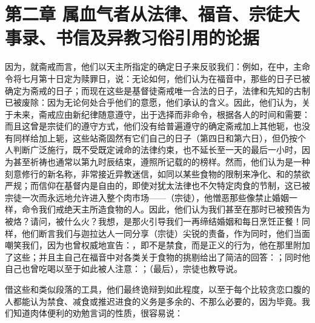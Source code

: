 
\section{第二章 属血气者从法律、福音、宗徒大事录、书信及异教习俗引用的论据}

因为，就斋戒而言，他们以天主所指定的确定日子来反驳我们：例如，在中，主命令将七月第十日定为赎罪日，说：无论如何，他们认为在福音中，那些的日子已被确定为斋戒的日子；而现在这些是基督徒斋戒唯一合法的日子，法律和先知的古制已被废除：因为无论何处合乎他们的意愿，他们承认的含义。因此，他们认为，关于未来，斋戒应由新纪律随意遵守，出于选择而非命令，根据各人的时间和需要：而且这曾是宗徒们的遵守方式，他们没有给普遍遵守的确定斋戒加上其他轭，也没有同样给加上轭，这些站斋固然有它们自己的日子（第四日和第六日），但仍按个人判断广泛施行，既不受既定诫命的法律约束，也不延长至一天的最后一小时，因为甚至祈祷也通常以第九时辰结束，遵照所记载的的榜样。然而，他们认为是一种刻意修行的新名称，非常接近异教迷信，如同以某些食物的限制来净化、和的禁欲严规；而信仰在基督内是自由的，即使对犹太法律也不欠特定肉食的节制，这已被宗徒一次而永远地允许进入整个肉市场——（宗徒），他憎恶那些像禁止婚姻一样，命令我们戒绝天主所造食物的人。因此，他们认为我们甚至在那时已被预告为被烙？请问，被什么火？我想，是那火引导我们一再缔结婚姻和每日烹饪正餐！同样，他们断言我们与迦拉达人一同分享（宗徒）尖锐的责备，作为同时，他们当面嘲笑我们，因为也曾权威地宣告：，即不是禁食，而是正义的行为，他在那里附加了这些；并且主自己在福音中对各类关于食物的挑剔给出了简洁的回答：；同时他自己也曾吃喝以至于如此被人注意：；（最后），宗徒也教导说。\par

借这些和类似段落的工具，他们最终诡辩到如此程度，以至于每个比较贪恋口腹的人都能认为禁食、减食或推迟进食的义务是多余的、不那么必要的，因为毕竟。我们知道肉体便利的劝勉言词的性质，很容易说：\par

